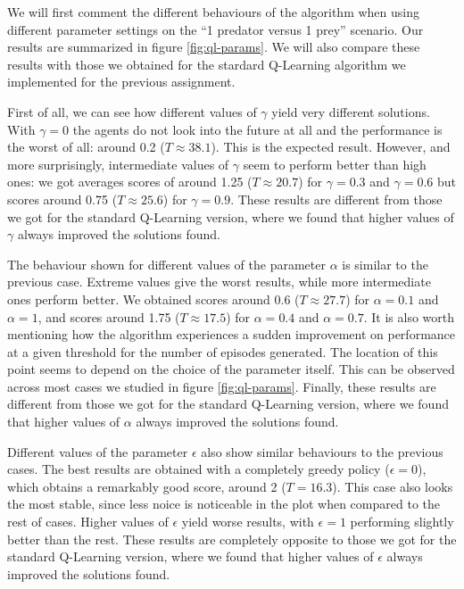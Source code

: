 \documentclass[a4paper,12pt]{article}
\begin{document}
We will first comment the different behaviours of the algorithm when using different parameter settings on the ``1 predator versus 1 prey'' scenario. Our results are summarized in figure \ref{fig:ql-params}. We will also compare these results with those we obtained for the stardard Q-Learning algorithm we implemented for the previous assignment.

First of all, we can see how different values of $\gamma$ yield very different solutions. With $\gamma = 0$ the agents do not look into the future at all and the performance is the worst of all: around 0.2 ($T \approx 38.1 $). This is the expected result. However, and more surprisingly, intermediate values of $\gamma$ seem to perform better than high ones: we got averages scores of around 1.25 ($T \approx 20.7 $) for $\gamma = 0.3$ and $\gamma = 0.6$ but scores around 0.75 ($T \approx 25.6 $) for $\gamma = 0.9$. These results are different from those we got for the standard Q-Learning version, where we found that higher values of $\gamma$ always improved the solutions found.

The behaviour shown for different values of the parameter $\alpha$ is similar to the previous case. Extreme values give the worst results, while more intermediate ones perform better. We obtained scores around 0.6 ($ T \approx 27.7 $) for $\alpha = 0.1$ and $\alpha = 1$, and scores around 1.75 ($ T \approx 17.5 $) for $\alpha = 0.4$ and $\alpha = 0.7$. It is also worth mentioning how the algorithm experiences a sudden improvement on performance at a given threshold for the number of episodes generated. The location of this point seems to depend on the choice of the parameter itself. This can be observed across most cases we studied in figure \ref{fig:ql-params}. Finally, these results are different from those we got for the standard Q-Learning version, where we found that higher values of $\alpha$ always improved the solutions found.

Different values of the parameter $\epsilon$ also show similar behaviours to the previous cases. The best results are obtained with a completely greedy policy ($\epsilon = 0$), which obtains a remarkably good score, around 2 ($T = 16.3 $). This case also looks the most stable, since less noice is noticeable in the plot when compared to the rest of cases. Higher values of $\epsilon$ yield worse results, with $\epsilon = 1$ performing slightly better than the rest. These results are completely opposite to those we got for the standard Q-Learning version, where we found that higher values of $\epsilon$ always improved the solutions found.
\end{document}
